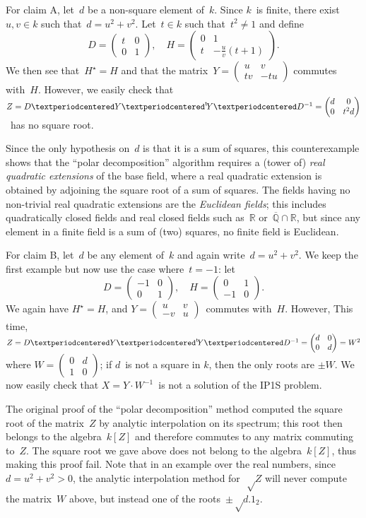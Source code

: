 \documentclass{article}%
\def\transpose#1{{\vphantom{#1}}^{\mathrm{t}}\!#1}
\def\mat#1{\begin{pmatrix}#1\end{pmatrix}}
\begin{document}
\medskip

For claim A, let~$d$ be a non-square element of~$k$.
Since $k$~is finite, there exist~$u, v ∈ k$ such that~$d = u^2 + v^2$.
Let~$t ∈ k$ such that~$t^2 ≠ 1$ and define
\[ D = \mat{t & 0 \\ 0 & 1}, \quad
H = \mat{0 & 1 \\ t & -\frac{u}{v}(t+1)}. \]
We then see that~$H^{⋆} = H$ and that
the matrix~$Y = \mat{u & v \\ t v & -t u}$ commutes with~$H$.
However, we easily check that
$Z = D · Y · \transpose{Y} · D^{-1} = \mat{d & 0 \\ 0 & t^2 d}$~has no square
root.

Since the only hypothesis on~$d$ is that it is a sum of squares,
this counterexample shows that the “polar decomposition” algorithm
requires a (tower of) \emph{real quadratic extensions} of the base field,
where a real quadratic extension is obtained by adjoining
the square root of a sum of squares.
The fields having no non-trivial real quadratic extensions
are the \emph{Euclidean fields};
this includes quadratically closed fields
and real closed fields such as~$ℝ$ or~$\overline{ℚ} ∩ ℝ$,
but since any element in a finite field is a sum of (two) squares,
no finite field is Euclidean.

\medskip

For claim B, let~$d$ be any element of~$k$ and again write~$d = u^2 + v^2$.
We keep the first example but now use the case where~$t = -1$: let
\[ D = \mat{-1 & 0 \\ 0 & 1}, \quad
H = \mat{0 & 1 \\ -1 & 0}. \]
We again have $H^{⋆} = H$, and $Y = \mat{u & v\\-v & u}$~commutes
with~$H$. However, This time,
$Z = D · Y · \transpose{Y} · D^{-1} = \mat{d & 0 \\ 0 & d} = W^2$
where $W = \mat{0 & d \\ 1 & 0}$;
if $d$~is not a square in $k$, then the only roots are $± W$.
We now easily check that
$X = Y · W^{-1}$~is not a solution of the IP1S problem.

The original proof of the “polar decomposition” method computed the
square root of the matrix~$Z$ by analytic interpolation on its spectrum;
this root then belongs to the algebra~$k[Z]$
and therefore commutes to any matrix commuting to~$Z$.
The square root we gave above does not belong to the algebra~$k[Z]$,
thus making this proof fail.
Note that in an example over the real numbers, since $d = u^2 + v^2 > 0$,
the analytic interpolation method for~$√Z$ will never compute
the matrix~$W$ above, but instead one of the roots~$±√{d}.1_{2}$.
\end{document}

